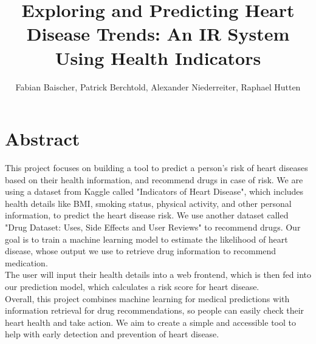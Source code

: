 \documentclass{article}
\title{Exploring and Predicting Heart Disease Trends: An IR System Using  Health Indicators}
\author{Fabian Baischer, Patrick Berchtold, Alexander Niederreiter, Raphael Hutten}
\begin{document}
\maketitle


\section{Abstract}

This project focuses on building a tool to predict a person’s risk of heart diseases based on their health information, and recommend drugs in case of risk.
We are using a dataset from Kaggle called "Indicators of Heart Disease",
which includes health details like BMI, smoking status, physical activity, and other personal information, to predict the heart disease risk.
We use another dataset called "Drug Dataset: Uses, Side Effects and User Reviews" to recommend drugs.
Our goal is to train a machine learning model to estimate the likelihood of heart disease,
whose output we use to retrieve drug information to recommend medication.\\
The user will input their health details into a web frontend, which is then fed into our prediction model, which calculates a risk score for heart disease.\\
Overall, this project combines machine learning for medical predictions with information retrieval for drug recommendations,
so people can easily check their heart health and take action.
We aim to create a simple and accessible tool to help with early detection and prevention of heart disease.
\end{document}
